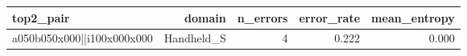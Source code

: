 \begin{tabular}{lrrrr}
\toprule
top2_pair & domain & n_errors & error_rate & mean_entropy \\
\midrule
a050b050x000||i100x000x000 & Handheld_S & 4 & 0.222 & 0.000 \\
\bottomrule
\end{tabular}
